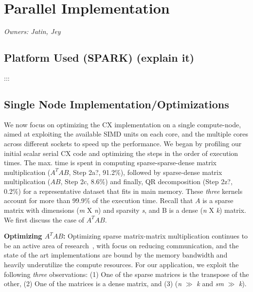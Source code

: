 \newcommand{\Comment}[2]{{\color{red}{#1} :::  \color{blue}{#2}}\\}

\newpage
\section{Parallel Implementation}
\textit{Owners: Jatin, Jey}

\subsection {Platform Used (SPARK) (explain it) }
    \Comment{Jatin}{Jey to explain the SPARK compute node, with some
    details on cache size, cores, SIMD width, etc.}



\subsection {Single Node Implementation/Optimizations}

    We now focus on optimizing the CX implementation on a single
    compute-node, aimed at exploiting the available SIMD units on each
    core, and the multiple cores across different sockets to speed up the performance. 
    We began by profiling our initial %
    scalar serial CX
    code and optimizing the steps in the order of execution times.
    The max. time is spent in computing sparse-sparse-dense matrix
    multiplication ($A^TAB$, Step 2a?, 91.2\%), followed by  sparse-dense matrix
    multiplication ($AB$, Step 2c, 8.6\%) and finally, QR
    decomposition (Step 2z?, 0.2\%)
    for a representative dataset that fits in main memory. These
    {\it{three}} kernels account for more than 99.9\% of
    the execution time.
    Recall that $A$ is a sparse matrix with dimensions ({\it{m}} X
    {\it{n}}) and sparsity {\it{s}}, and B is a dense ({\it{n}} X {\it{k}}) matrix.
    We first discuss the case of $A^TAB$.

\vspace*{0.1in} 
{\bf{{ {Optimizing $A^TAB$:}}}}
    Optimizing sparse matrix-matrix  multiplication continues to be an
    active area of research~\cite{ballard13,patwary15}, with focus on
    reducing communication, and the state of the art implementations
    are bound by the memory bandwidth and heavily
    underutilize the compute resources. 
    For our application, we exploit the following {\it{three}} observations:
    (1) One of the sparse matrices is the transpose of the other,   
    (2) One of the matrices is a dense matrix,   and    %
    (3) ({\it{n}} $\gg$  {\it{k}} and  {\it{sm}} $\gg$ {\it{k}}).

